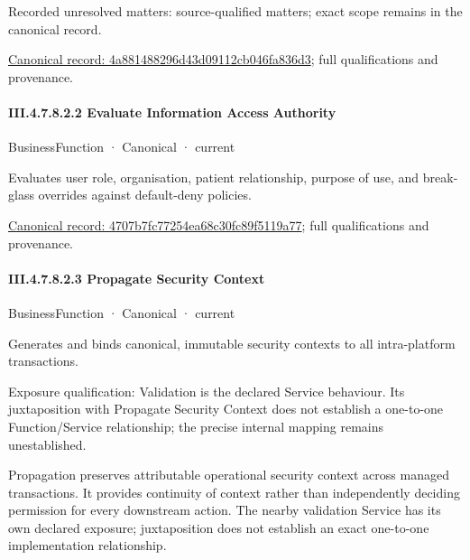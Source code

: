 {\small Recorded unresolved matters: source-qualified matters; exact scope remains in the canonical record.}\par
{\footnotesize \href{../../../../continuum/business/business-function/4a881488296d43d09112cb046fa836d3.md}{Canonical record: 4a881488296d43d09112cb046fa836d3}; full qualifications and provenance.}\par
\paragraph*{III.4.7.8.2.2 Evaluate Information Access Authority}
\label{navigation:III.4.7.8.2.2}

\label{element:4707b7fc77254ea68c30fc89f5119a77}
{\small BusinessFunction · Canonical · current}\par

Evaluates user role, organisation, patient relationship, purpose of use, and break-glass overrides against default-deny policies.


{\footnotesize \href{../../../../continuum/business/business-function/4707b7fc77254ea68c30fc89f5119a77.md}{Canonical record: 4707b7fc77254ea68c30fc89f5119a77}; full qualifications and provenance.}\par
\paragraph*{III.4.7.8.2.3 Propagate Security Context}
\label{navigation:III.4.7.8.2.3}

\label{element:ee79679c6b5041659a2efca15190454f}
{\small BusinessFunction · Canonical · current}\par

Generates and binds canonical, immutable security contexts to all intra-platform transactions.



Exposure qualification: Validation is the declared Service behaviour. Its juxtaposition with Propagate Security Context does not establish a one-to-one Function/Service relationship; the precise internal mapping remains unestablished.



Propagation preserves attributable operational security context across managed transactions. It provides continuity of context rather than independently deciding permission for every downstream action. The nearby validation Service has its own declared exposure; juxtaposition does not establish an exact one-to-one implementation relationship.



